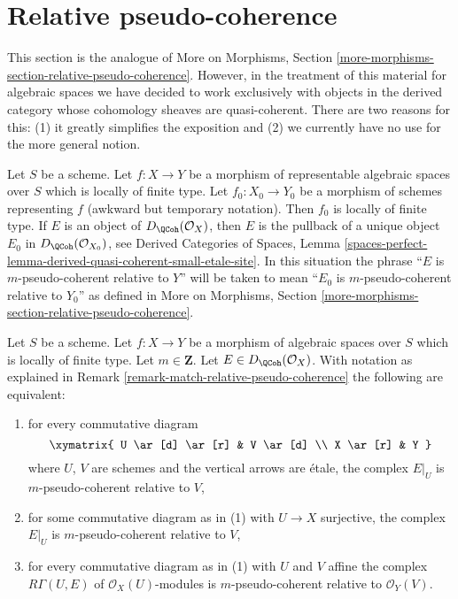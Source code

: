 \section{Relative pseudo-coherence}
\label{section-relative-pseudo-coherence}

\noindent
This section is the analogue of
More on Morphisms, Section
\ref{more-morphisms-section-relative-pseudo-coherence}.
However, in the treatment of this material for
algebraic spaces we have decided to work exclusively
with objects in the derived category whose cohomology
sheaves are quasi-coherent. There are two reasons for this:
(1) it greatly simplifies the exposition and
(2) we currently have no use for the more general notion.

\begin{remark}
\label{remark-match-relative-pseudo-coherence}
Let $S$ be a scheme. Let $f : X \to Y$ be a morphism of representable
algebraic spaces over $S$ which is locally of finite type. Let
$f_0 : X_0 \to Y_0$ be a morphism of schemes representing $f$
(awkward but temporary notation). Then $f_0$ is locally of finite type.
If $E$ is an object of $D_\QCoh(\mathcal{O}_X)$, then $E$
is the pullback of a unique object $E_0$ in $D_\QCoh(\mathcal{O}_{X_0})$, see
Derived Categories of Spaces, Lemma
\ref{spaces-perfect-lemma-derived-quasi-coherent-small-etale-site}.
In this situation the phrase ``$E$ is $m$-pseudo-coherent relative to $Y$''
will be taken to mean ``$E_0$ is $m$-pseudo-coherent relative to $Y_0$''
as defined in More on Morphisms, Section
\ref{more-morphisms-section-relative-pseudo-coherence}.
\end{remark}

\begin{lemma}
\label{lemma-qcoh-relative-pseudo-coherence-characterize}
Let $S$ be a scheme. Let $f : X \to Y$ be a morphism of algebraic spaces
over $S$ which is locally of finite type. Let $m \in \mathbf{Z}$.
Let $E \in D_\QCoh(\mathcal{O}_X)$. With notation as explained in
Remark \ref{remark-match-relative-pseudo-coherence}
the following are equivalent:
\begin{enumerate}
\item for every commutative diagram
$$
\xymatrix{
U \ar[d] \ar[r] & V \ar[d] \\
X \ar[r] & Y
}
$$
where $U$, $V$ are schemes and the vertical arrows are \'etale, the complex
$E|_U$ is $m$-pseudo-coherent relative to $V$,
\item for some commutative diagram as in (1) with $U \to X$
surjective, the complex $E|_U$ is $m$-pseudo-coherent relative to $V$,
\item for every commutative diagram as in (1) with $U$ and $V$
affine the complex $R\Gamma(U, E)$ of $\mathcal{O}_X(U)$-modules
is $m$-pseudo-coherent relative to $\mathcal{O}_Y(V)$.
\end{enumerate}
\end{lemma}

